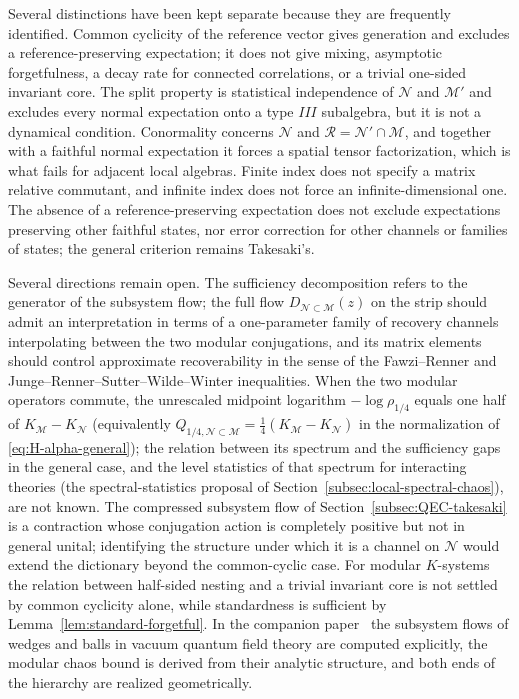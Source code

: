 \documentclass[a4paper,11pt]{article}
\theoremstyle{definition}
\newcommand{\mR}{\mathcal{R}}
\newcommand{\mN}{\mathcal{N}}
\newcommand{\mM}{\mathcal{M}}
\begin{document}
Several distinctions have been kept separate because they are frequently identified. Common cyclicity of the reference vector gives generation and excludes a reference-preserving expectation; it does not give mixing, asymptotic forgetfulness, a decay rate for connected correlations, or a trivial one-sided invariant core. The split property is statistical independence of $\mN$ and $\mM'$ and excludes every normal expectation onto a type $III$ subalgebra, but it is not a dynamical condition. Conormality concerns $\mN$ and $\mR=\mN'\cap\mM$, and together with a faithful normal expectation it forces a spatial tensor factorization, which is what fails for adjacent local algebras. Finite index does not specify a matrix relative commutant, and infinite index does not force an infinite-dimensional one. The absence of a reference-preserving expectation does not exclude expectations preserving other faithful states, nor error correction for other channels or families of states; the general criterion remains Takesaki's.

Several directions remain open. The sufficiency decomposition refers to the generator of the subsystem flow; the full flow $D_{\mN\subset\mM}(z)$ on the strip should admit an interpretation in terms of a one-parameter family of recovery channels interpolating between the two modular conjugations, and its matrix elements should control approximate recoverability in the sense of the Fawzi--Renner and Junge--Renner--Sutter--Wilde--Winter inequalities. When the two modular operators commute, the unrescaled midpoint logarithm $-\log\rho_{1/4}$ equals one half of $K_{\mM}-K_{\mN}$ (equivalently $Q_{1/4,\mN\subset\mM}=\tfrac14(K_{\mM}-K_{\mN})$ in the normalization of \eqref{eq:H-alpha-general}); the relation between its spectrum and the sufficiency gaps in the general case, and the level statistics of that spectrum for interacting theories (the spectral-statistics proposal of Section~\ref{subsec:local-spectral-chaos}), are not known. The compressed subsystem flow of Section~\ref{subsec:QEC-takesaki} is a contraction whose conjugation action is completely positive but not in general unital; identifying the structure under which it is a channel on $\mN$ would extend the dictionary beyond the common-cyclic case. For modular $K$-systems the relation between half-sided nesting and a trivial invariant core is not settled by common cyclicity alone, while standardness is sufficient by Lemma~\ref{lem:standard-forgetful}. In the companion paper~\cite{companionQFT} the subsystem flows of wedges and balls in vacuum quantum field theory are computed explicitly, the modular chaos bound is derived from their analytic structure, and both ends of the hierarchy are realized geometrically.
\end{document}
